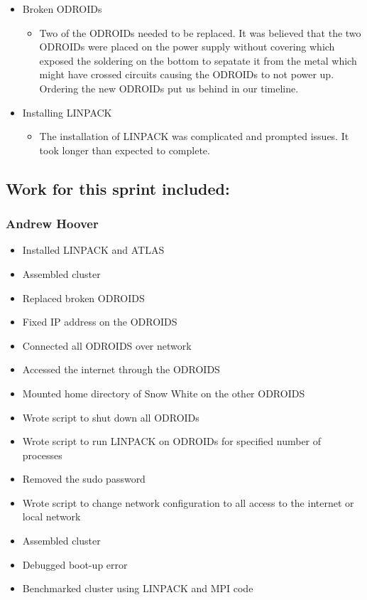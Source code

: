 \begin{itemize}
\begin{itemize}
\begin{itemize}
		\end{itemize}	
		\item Broken ODROIDs
		\begin{itemize}
			\item Two of the ODROIDs needed to be replaced. It was believed that the two ODROIDs were placed on the power supply without covering which exposed the soldering on the bottom to sepatate it from the metal which might have crossed circuits causing the ODROIDs to not power up. Ordering the new ODROIDs put us behind in our timeline.
		\end{itemize}
		\item Installing LINPACK
		\begin{itemize}
			\item The installation of LINPACK was complicated and prompted issues. It took longer than expected to complete.
		\end{itemize}
	\end{itemize}
\end{itemize}

\subsection*{Work for this sprint included:}
\subsubsection*{Andrew Hoover}
\begin{itemize}
	\item Installed LINPACK and ATLAS
	\item Assembled cluster
	\item Replaced broken ODROIDS
	\item Fixed IP address on the ODROIDS
	\item Connected all ODROIDS over network
	\item Accessed the internet through the ODROIDS
	\item Mounted home directory of Snow White on the other ODROIDS
	\item Wrote script to shut down all ODROIDs
	\item Wrote script to run LINPACK on ODROIDs for specified number of processes
	\item Removed the sudo password
	\item Wrote script to change network configuration to all access to the internet or local network
	\item Assembled cluster
	\item Debugged boot-up error
	\item Benchmarked cluster using LINPACK and MPI code
\end{itemize}

